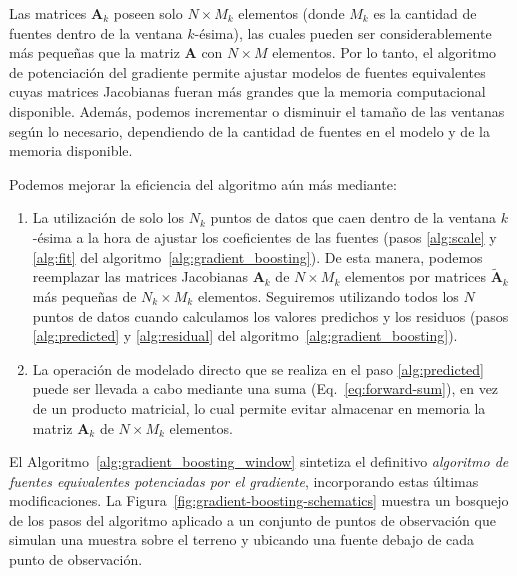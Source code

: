 Las matrices $\mathbf{A}_k$ poseen solo $N \times M_k$ elementos (donde $M_k$
es la cantidad de fuentes dentro de la ventana $k$-ésima), las cuales pueden
ser considerablemente más pequeñas que la matriz $\mathbf{A}$ con $N \times M$
elementos.
Por lo tanto, el algoritmo de potenciación del gradiente permite ajustar
modelos de fuentes equivalentes cuyas matrices Jacobianas fueran más grandes
que la memoria computacional disponible.
Además, podemos incrementar o disminuir el tamaño de las ventanas según lo
necesario, dependiendo de la cantidad de fuentes en el modelo y de la memoria
disponible.

Podemos mejorar la eficiencia del algoritmo aún más mediante:

\begin{enumerate}
  \item La utilización de solo los $N_k$ puntos de datos que caen dentro de la
      ventana $k$-ésima a la hora de ajustar los coeficientes de las fuentes
      (pasos \ref{alg:scale} y \ref{alg:fit} del
      algoritmo~\ref{alg:gradient_boosting}).
      De esta manera, podemos reemplazar las matrices Jacobianas $\mathbf{A}_k$
      de $N \times M_k$ elementos por matrices $\tilde{\mathbf{A}}_k$ más
      pequeñas de $N_k \times M_k$ elementos.
      Seguiremos utilizando todos los $N$ puntos de datos cuando calculamos los
      valores predichos y los residuos (pasos \ref{alg:predicted}
      y \ref{alg:residual} del algoritmo~\ref{alg:gradient_boosting}).
  \item La operación de modelado directo que se realiza en el paso \ref{alg:predicted}
      puede ser llevada a cabo mediante una suma (Eq.~\ref{eq:forward-sum}),
      en vez de un producto matricial, lo cual permite evitar almacenar en
      memoria la matriz $\mathbf{A}_k$ de $N \times M_k$ elementos.
\end{enumerate}

El Algoritmo~\ref{alg:gradient_boosting_window} sintetiza el definitivo
\textit{algoritmo de fuentes equivalentes potenciadas por el gradiente},
incorporando estas últimas modificaciones.
La Figura~\ref{fig:gradient-boosting-schematics} muestra un bosquejo de los
pasos del algoritmo aplicado a un conjunto de puntos de observación que simulan
una muestra sobre el terreno y ubicando una fuente debajo de cada punto de
observación.

